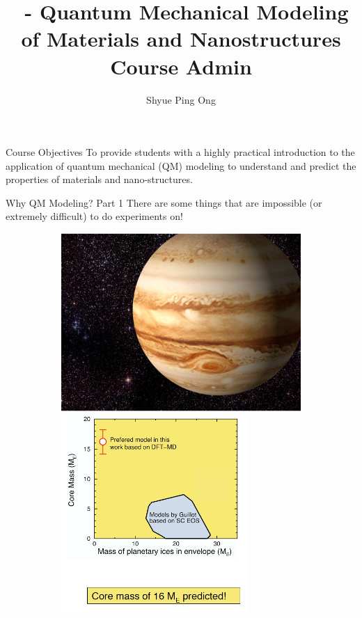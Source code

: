 \documentclass[aspectratio=169]{beamer}
\title[\classname Course Admin]{\classname~- Quantum Mechanical Modeling of Materials and Nanostructures\\Course Admin}
\author{Shyue Ping Ong}
\institute[UCSD]{University of California, San Diego\\
\medskip
}
\date{\classyear} %
\begin{document}
    \begin{frame}
        \titlepage %
    \end{frame}


    \begin{frame}{Course Objectives}
        \huge{To provide students with a highly practical introduction to the application of quantum mechanical (QM) modeling to understand and predict the properties of materials and nano-structures.
        }
    \end{frame}


    \begin{frame}{Why QM Modeling? Part 1}
        There are some things that are impossible (or extremely difficult) to do experiments on!
        \begin{figure}
            \centering
            \begin{subfigure}{0.2\textwidth}
                \includegraphics[width=\linewidth]{lectures/figures/0.3_Jupiter_1.png}
                \includegraphics[width=\linewidth]{lectures/figures/0.3_Jupiter_2.png}

\end{subfigure}
\end{figure}
\end{frame}
\end{document}
